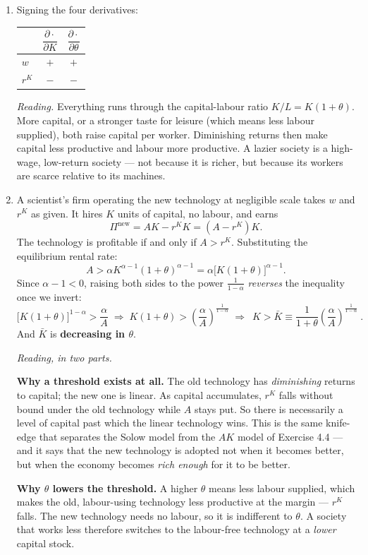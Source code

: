 \documentclass[12pt, letterpaper]{article}
\newcommand{\pd}[2]{\dfrac{\partial #1}{\partial #2}}
\begin{document}
\begin{tcolorbox}[evenbox,title={Problem 9.8 \quad A New Technology}]
\begin{enumerate}
\item Signing the four derivatives:
\begin{center}
\begin{tabular}{lcc}
\toprule
& $\pd{\cdot}{K}$ & $\pd{\cdot}{\theta}$ \\
\midrule
$w$ & $+$ & $+$ \\
$r^K$ & $-$ & $-$ \\
\bottomrule
\end{tabular}
\end{center}
\emph{Reading.} Everything runs through the capital-labour ratio $K/L=K(1+\theta)$. More
capital, or a stronger taste for leisure (which means less labour supplied), both raise
capital per worker. Diminishing returns then make capital less productive and labour more
productive. A lazier society is a high-wage, low-return society --- not because it is richer,
but because its workers are scarce relative to its machines.

\item A scientist's firm operating the new technology at negligible scale takes $w$ and $r^K$
as given. It hires $K$ units of capital, no labour, and earns
\[
\Pi^{\text{new}}=AK-r^KK=(A-r^K)K .
\]
The technology is profitable if and only if $A>r^K$. Substituting the equilibrium rental
rate:
\[
A>\alpha K^{\alpha-1}(1+\theta)^{\alpha-1}=\alpha\big[K(1+\theta)\big]^{\alpha-1}.
\]
Since $\alpha-1<0$, raising both sides to the power $\frac{1}{1-\alpha}$ \emph{reverses} the
inequality once we invert:
\[
\big[K(1+\theta)\big]^{1-\alpha}>\frac{\alpha}{A}
\;\Longrightarrow\;
K(1+\theta)>\left(\frac{\alpha}{A}\right)^{\frac{1}{1-\alpha}}
\;\Longrightarrow\;
\boxed{\ K>\bar K\equiv\frac{1}{1+\theta}\left(\frac{\alpha}{A}\right)^{\frac{1}{1-\alpha}}\ }.
\]
And $\bar K$ is \textbf{decreasing in $\theta$}.

\smallskip
\emph{Reading, in two parts.}

\textbf{Why a threshold exists at all.} The old technology has \emph{diminishing} returns to
capital; the new one is linear. As capital accumulates, $r^K$ falls without bound under the
old technology while $A$ stays put. So there is necessarily a level of capital past which the
linear technology wins. This is the same knife-edge that separates the Solow model from the
$AK$ model of Exercise 4.4 --- and it says that the new technology is adopted not when it
becomes better, but when the economy becomes \emph{rich enough} for it to be better.

\textbf{Why $\theta$ lowers the threshold.} A higher $\theta$ means less labour supplied,
which makes the old, labour-using technology less productive at the margin --- $r^K$ falls.
The new technology needs no labour, so it is indifferent to $\theta$. A society that works
less therefore switches to the labour-free technology at a \emph{lower} capital stock.
\end{enumerate}
\end{tcolorbox}
\end{document}
